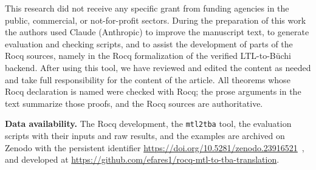 \documentclass[manuscript]{acmart}
\begin{document}
\begin{acks}
This research did not receive any specific grant from funding agencies in the
public, commercial, or not-for-profit sectors. During the preparation of this
work the authors used Claude (Anthropic) to improve the manuscript text, to
generate evaluation and checking scripts, and to assist the
development of parts of the Rocq sources, namely in the Rocq formalization of the verified LTL-to-B\"uchi backend. After using this tool, we have reviewed and
edited the content as needed and take full responsibility for the content of the
article. All theorems whose Rocq declaration is named were checked with Rocq;
the prose arguments in the text summarize those proofs, and the Rocq sources
are authoritative.
\end{acks}

\textbf{Data availability.} The Rocq development, the \texttt{mtl2tba} tool, the evaluation scripts with their inputs and raw results, and the examples are archived on Zenodo with the persistent identifier \url{https://doi.org/10.5281/zenodo.23916521}~\cite{fares_zenodo_artifact}, and developed at \url{https://github.com/efares1/rocq-mtl-to-tba-translation}.



\end{document}
